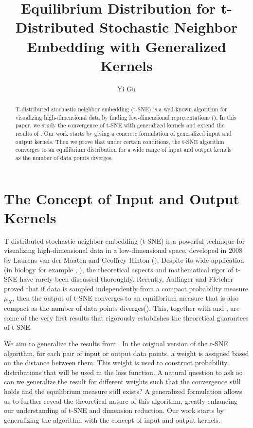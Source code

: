 \documentclass[10pt]{article}
\author{Yi Gu}
\newenvironment{Proof of lemma}{\noindent{\bf Proof of Lemma}}{\hfill$\Box$\newline}
\newenvironment{Proof of claim}{\noindent{\bf Proof of claim}}{\hfill$\Box$\newline}
\newenvironment{Proof of theorem}{\noindent{\bf Proof of Theorem}}{\hfill\scriptsize{$\Box$}\newline}
\newenvironment{Proof of theorems}{\noindent{\bf Proof of Theorems}}{\hfill$\Box$\newline}
\newenvironment{Proof of proposition}{\noindent{\bf Proof of Proposition}}{\hfill$\Box$\newline}
\newenvironment{Proof of propositions}{\noindent{\bf Proof of Propositions}}{\hfill$\Box$\newline}
\newenvironment{Proof of exercise}{\noindent{\it Proof of Exercise:}}{\hfill$\Box$}
\numberwithin{equation}{section}
\begin{document}
\title{Equilibrium Distribution for t-Distributed Stochastic Neighbor Embedding with Generalized Kernels}
\maketitle

\begin{abstract}
    T-distributed stochastic neighbor embedding (t-SNE) is a well-known algorithm for visualizing high-dimensional data by finding low-dimensional representations (\cite{key}). In this paper, we study the convergence of t-SNE with generalized kernels and extend the results of \cite{auffinger-tsne}. Our work starts by giving a concrete formulation of generalized input and output kernels. Then we prove that under certain conditions, the t-SNE algorithm converges to an equilibrium distribution for a wide range of input and output kernels as the number of data points diverges.
\end{abstract}

\section{The Concept of Input and Output Kernels} \label{sec_intro}
T-distributed stochastic neighbor embedding (t-SNE) is a powerful technique for
visualizing high-dimensional data in a low-dimensional space, developed in 2008
by Laurens van der Maaten and Geoffrey Hinton (\cite{key}). Despite its wide
application (in biology for example \cite{LindermanGeorgeC.2019Fitf}, \cite{10.1093/bioinformatics/btp035}), the
theoretical aspects and mathematical rigor of t-SNE have rarely been discussed
thoroughly. Recently, Auffinger and Fletcher proved that if data is sampled
independently from a compact probability measure $\mu_X$, then the output of
t-SNE converges to an equilibrium measure that is also compact as the number of
data points diverges(\cite{auffinger-tsne}). This, together with
\cite{arora2018analysistsnealgorithmdata} and
\cite{linderman2017clusteringtsneprovably}, are some of the very first results
that rigorously establishes the theoretical guarantees of t-SNE.

We aim to generalize the results from \cite{auffinger-tsne}. In the original
version of the t-SNE algorithm, for each pair of input or output data points, a
weight is assigned based on the distance between them. This weight is used to
construct probability distributions that will be used in the loss function. A
natural question to ask is: can we generalize the result for different weights
such that the convergence still holds and the equilibrium measure still exists?
A generalized formulation allows us to further reveal the theoretical nature of
this algorithm, greatly enhancing our understanding of t-SNE and dimension
reduction. Our work starts by generalizing the algorithm with the concept of
input and output kernels.
\end{document}
